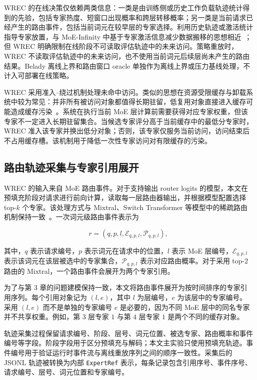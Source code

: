 WREC 的在线决策仅依赖两类信息：一类是由训练侧或历史工作负载轨迹统计得到的先验，包括专家热度、短窗口出现概率和跨层转移概率；另一类是当前请求已经产生的路由事件，包括当前词元在较早层的专家选择。利用历史轨迹或激活统计指导专家放置，与 MoE-Infinity 中基于专家激活信息减少数据搬移的思想相近~\cite{xue2024moeinfinity}；但 WREC 明确限制在线阶段不可读取评估轨迹中的未来访问。策略重放时，WREC 不读取评估轨迹中的未来访问，也不使用当前词元后续层尚未产生的路由结果。Belady 离线上界和路由窗口 oracle 单独作为离线上界或压力基线处理，不计入可部署在线策略。

WREC 采用准入--绕过机制处理未命中访问。类似的思想在资源受限缓存与卸载系统中较为常见：并非所有被访问对象都值得长期驻留，低复用对象直接进入缓存可能造成缓存污染~\cite{song2023powerinfer,zhang2024h2o}。系统在执行当前 MoE 层计算前需要获得对应专家权重，但该专家不一定进入长期驻留集合。当候选专家评分高于当前缓存中的最低分专家时，WREC 准入该专家并换出低分对象；否则，该专家仅服务当前访问，访问结束后不占用缓存槽。该机制用于降低一次性专家访问对有限缓存的污染。

\subsection{路由轨迹采集与专家引用展开}

WREC 的输入来自 MoE 路由事件。对于支持输出 router logits 的模型，本文在预填充阶段对请求进行前向计算，读取每一层路由器输出，并根据模型配置选择 top-$k$ 个专家。该处理方式与 Mixtral、Switch Transformer 等模型中的稀疏路由机制保持一致~\cite{jiang2024mixtral,fedus2022switch}。一次词元级路由事件表示为

\begin{equation}
    \label{equ:wrec-router-event-detail}
    r=(q,p,l,\mathcal{E}_{q,p,l},\mathcal{P}_{q,p,l}),
\end{equation}

其中，$q$ 表示请求编号，$p$ 表示词元在请求中的位置，$l$ 表示 MoE 层编号，$\mathcal{E}_{q,p,l}$ 表示该词元在该层被选中的专家集合，$\mathcal{P}_{q,p,l}$ 表示对应路由概率。对于采用 top-$2$ 路由的 Mixtral，一个路由事件会展开为两个专家引用。

为了与第 3 章的问题建模保持一致，本文将路由事件展开为按时间排序的专家引用序列。每个引用对象记为 $(l,e)$，其中 $l$ 为层编号，$e$ 为该层中的专家编号。采用 $(l,e)$ 而不是单独的专家编号 $e$ 是必要的，因为不同 MoE 层中的同名专家并不共享权重。例如，第 $3$ 层专家 $1$ 与第 $4$ 层专家 $1$ 是两个不同的缓存对象。

轨迹采集过程保留请求编号、阶段、层号、词元位置、被选专家、路由概率和事件编号等字段。阶段字段用于区分预填充与解码；本文主实验只使用预填充轨迹。事件编号用于验证运行时事件流与离线重放序列之间的顺序一致性。采集后的 JSONL 轨迹被转换为内部 \texttt{ExpertRef} 表示，每条记录包含引用序号、事件序号、请求编号、层号、词元位置和专家编号。


